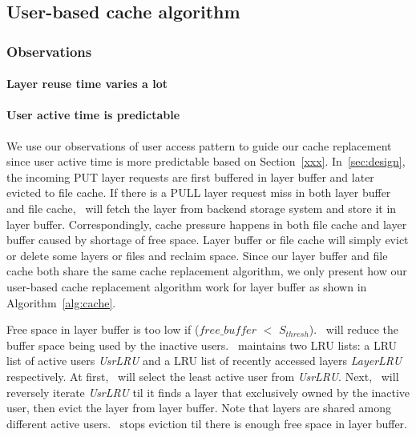 \subsection{User-based cache algorithm}
\label{sec:design_cache_algori}

\subsubsection{Observations}


\paragraph{Layer reuse time varies a lot}

\paragraph{User active time is predictable}



We use our observations of user access pattern to guide our cache replacement
since user active time is more predictable based on Section~\ref{xxx}.
In~\cref{sec:design}, the incoming PUT layer requests are first buffered in layer buffer and later evicted to file cache.
If there is a PULL layer request miss in both layer buffer and file cache, 
\sysname~will fetch the layer from backend storage system and store it in layer buffer.
Correspondingly, cache pressure happens in both file cache and layer buffer caused by shortage of free space.
Layer buffer or file cache will simply evict or delete some layers or files and reclaim space.
Since our layer buffer and file cache both share the same cache replacement algorithm, we only present
how our user-based cache replacement algorithm work for layer buffer as shown in Algorithm~\ref{alg:cache}.

Free space in layer buffer is too low if ($free\_buffer$ $<$ $S_{thresh}$). 
\sysname~will reduce the buffer space being used by the inactive users. 
\sysname~maintains two LRU lists: a LRU list of active users \emph{UsrLRU} and
a LRU list of recently accessed layers \emph{LayerLRU} respectively.
At first, \sysname~will select the least active user from \emph{UsrLRU}.
Next, \sysname~will reversely iterate \emph{UsrLRU} til it finds a layer that exclusively owned by the inactive user, 
then evict the layer from layer buffer. 
 Note that layers are shared among different active users.
 \sysname~stops eviction til there is enough free space in layer buffer.
 


